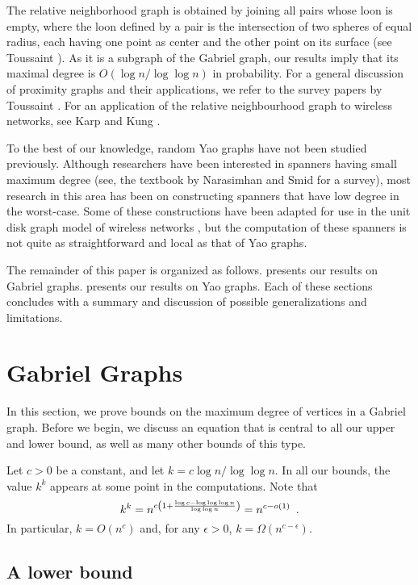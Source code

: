 \documentclass[lotsofwhite,charterfonts]{patmorin}
\begin{document}
The relative neighborhood graph is obtained by joining all pairs whose
loon is empty, where the loon defined by a pair is the intersection of two
spheres of equal radius, each having one point as center and the other
point on its surface (see Toussaint \cite{t80a}).  As it is a subgraph of
the Gabriel graph, our results imply that its maximal degree is $O(\log
n /\log \log n)$ in probability.  For a general discussion of proximity
graphs and their applications, we refer to the survey papers by Toussaint
\cite{t80b,t82}.  For an application of the relative neighbourhood graph to
wireless networks, see Karp and Kung \cite{kk00}.

To the best of our knowledge, random Yao graphs have not been studied
previously. Although researchers have been interested in spanners having
small maximum degree (see, the textbook by Narasimhan and Smid \cite{ns07} for
a survey), most research in this area has been on constructing
spanners that have low degree in the worst-case.  Some of these
constructions have been adapted for use in the unit disk graph model of
wireless networks \cite{wl06}, but the computation of these spanners is not
quite as straightforward and local as that of Yao graphs.

The remainder of this paper is organized as follows.  
presents our results on Gabriel graphs.   presents our
results on Yao graphs.  Each of these sections concludes with a summary
and discussion of possible generalizations and limitations.

\section{Gabriel Graphs}


In this section, we prove bounds on the maximum degree of vertices in a
Gabriel graph.  Before we begin, we discuss an equation that is central to
all our upper and lower bound, as well as many other bounds of this type.

Let $c>0$ be a constant, and let $k=c\log n/\log\log n$.  In all our
bounds, the value $k^k$ appears at some point in the computations.  Note that
\begin{equation}
    k^k = n^{c\left(1+\frac{\log c - \log\log\log n}{\log\log n}\right)} = n^{c-o(1)}
   \enspace . \eqlabel{central}
\end{equation}
In particular, $k=O(n^c)$ and, for any $\epsilon >0$,
$k=\Omega(n^{c-\epsilon})$.  


\subsection{A lower bound}
\end{document}
